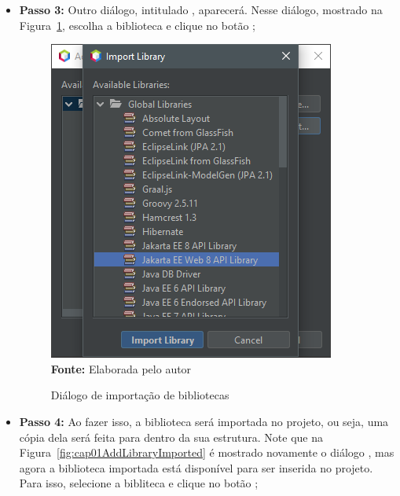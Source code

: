 \begin{itemize}
    \item \textbf{Passo 3:} Outro diálogo, intitulado , aparecerá. Nesse diálogo, mostrado na Figura~\ref{fig:cap01AddLibraryImport}, escolha a biblioteca  e clique no botão ;
    
    \FloatBarrier
    \begin{figure}[!htbp]
        \centering
        \caption{Diálogo de importação de bibliotecas}
        \includegraphics[scale=0.9]{imagens/cap01AddLibraryImport}
        \\\textbf{Fonte:} Elaborada pelo autor
        \label{fig:cap01AddLibraryImport}
    \end{figure}
    \FloatBarrier
    
    \item \textbf{Passo 4:} Ao fazer isso, a biblioteca será importada no projeto, ou seja, uma cópia dela será feita para dentro da sua estrutura. Note que na Figura~\ref{fig:cap01AddLibraryImported} é mostrado novamente o diálogo , mas agora a biblioteca importada está disponível para ser inserida no projeto. Para isso, selecione a bibliteca e clique no botão ;
    

\end{itemize}
